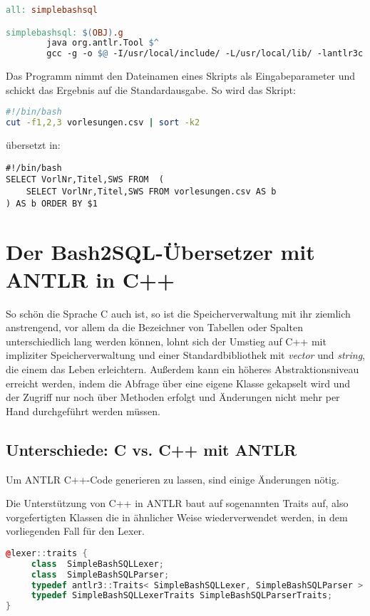 \begin{lstlisting}[language=make]
all: simplebashsql

simplebashsql: $(OBJ).g
        java org.antlr.Tool $^
        gcc -g -o $@ -I/usr/local/include/ -L/usr/local/lib/ -lantlr3c $(OBJ)Parser.c $(OBJ)Lexer.c
\end{lstlisting}

Das Programm nimmt den Dateinamen eines Skripts als Eingabeparameter und schickt das Ergebnis auf die Standardausgabe. So wird das Skript:
\begin{lstlisting}[language=Bash]
#!/bin/bash
cut -f1,2,3 vorlesungen.csv | sort -k2
\end{lstlisting}
übersetzt in:
\begin{lstlisting}
#!/bin/bash
SELECT VorlNr,Titel,SWS FROM  (
	SELECT VorlNr,Titel,SWS FROM vorlesungen.csv AS b
) AS b ORDER BY $1 
\end{lstlisting}

\section{Der Bash2SQL-Übersetzer mit ANTLR in C++}
So schön die Sprache C auch ist, so ist die Speicherverwaltung mit ihr ziemlich anstrengend, vor allem da die Bezeichner von Tabellen oder Spalten unterschiedlich lang werden können, lohnt sich der Umstieg auf C++ mit impliziter Speicherverwaltung und einer Standardbibliothek mit \textit{vector} und \textit{string}, die einem das Leben erleichtern. Außerdem kann ein höheres Abstraktionsniveau erreicht werden, indem die Abfrage über eine eigene Klasse gekapselt wird und der Zugriff nur noch über Methoden erfolgt und Änderungen nicht mehr per Hand durchgeführt werden müssen.

\subsection{Unterschiede: C vs. C++ mit ANTLR}
Um ANTLR C++-Code generieren zu lassen, sind einige Änderungen nötig.

Die Unterstützung von C++ in ANTLR baut auf sogenannten Traits auf, also vorgefertigten Klassen die in ähnlicher Weise wiederverwendet werden, in dem vorliegenden Fall für den Lexer.

\begin{lstlisting}[language=C++]
@lexer::traits {
     class  SimpleBashSQLLexer;
     class  SimpleBashSQLParser;
     typedef antlr3::Traits< SimpleBashSQLLexer, SimpleBashSQLParser > SimpleBashSQLLexerTraits;
     typedef SimpleBashSQLLexerTraits SimpleBashSQLParserTraits;
}
\end{lstlisting}

